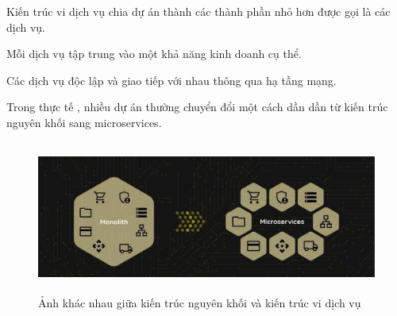 Kiến trúc vi dịch vụ chia dự án thành các thành phần nhỏ hơn được gọi là các dịch vụ.

Mỗi dịch vụ tập trung vào một khả năng kinh doanh cụ thể.

Các dịch vụ độc lập và giao tiếp với nhau thông qua hạ tầng mạng.

Trong  thực tế ,  nhiều dự án  thường      chuyển đổi một cách dần dần từ   kiến trúc nguyên khối sang   microservices.

\begin{figure}[h]
    \centering

    \includegraphics[height = 5cm]{pictures/anh_khac_nhau_giua_kien_truc_nguyen_khoi_va_kien_truc_vi_dich_vu/main.jpg}
    \caption{Ảnh khác nhau giữa kiến trúc nguyên khối và kiến trúc vi dịch vụ}
\end{figure}

%





